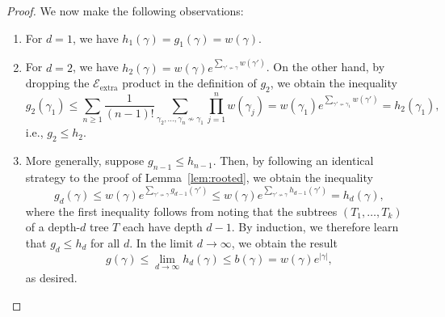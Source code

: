 \begin{proof}
We now make the following observations:
\begin{enumerate}
    \item For $d = 1$, we have $h_1(\gamma) = g_1(\gamma) = w(\gamma)$.
    \item For $d = 2$, we have $h_2(\gamma) = w(\gamma) e^{\sum_{\gamma' \nsim \gamma} w(\gamma')}$. On the other hand, by dropping the $\mathcal{E}_{\text{extra}}$ product in the definition of $g_2$, we obtain the inequality
    \begin{equation}
        g_2(\gamma_1) \leq \sum_{n \geq 1} \frac{1}{(n-1)!} \sum_{\gamma_2, \ldots , \gamma_n \nsim \gamma_1} \prod_{j = 1}^n w(\gamma_j) = w(\gamma_1) e^{\sum_{\gamma' \nsim \gamma_1} w(\gamma')} = h_2(\gamma_1) ,
    \end{equation}
    i.e., $g_2 \leq h_2$.
    \item More generally, suppose $g_{n - 1} \leq h_{n-1}$. Then, by following an identical strategy to the proof of Lemma~\ref{lem:rooted}, we obtain the inequality
    \begin{equation}
        g_d(\gamma) \leq w(\gamma) e^{\sum_{\gamma' \nsim \gamma} g_{d-1}(\gamma')} \leq w(\gamma) e^{\sum_{\gamma' \nsim \gamma} h_{d-1}(\gamma')} = h_d(\gamma) ,
    \end{equation}
    where the first inequality follows from noting that the subtrees $(T_1 , \ldots , T_k)$ of a depth-$d$ tree $T$ each have depth $d-1$. By induction, we therefore learn that $g_d \leq h_d$ for all $d$. In the limit $d \to \infty$, we obtain the result
    \begin{equation}
        g(\gamma) \leq \lim_{d \to \infty} h_d(\gamma) \leq b(\gamma) = w(\gamma) e^{| \gamma | } ,
    \end{equation}
    as desired.
\end{enumerate}
\end{proof}







